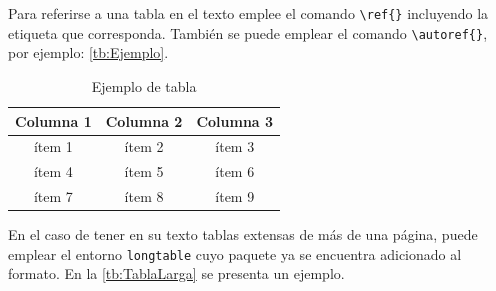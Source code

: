 Para referirse a una tabla en el texto emplee el comando \lstinline|\ref{}| incluyendo la etiqueta que corresponda. También se puede emplear el comando \lstinline|\autoref{}|, por ejemplo: \autoref{tb:Ejemplo}.

\begin{table}[]
	\centering
	\captionsetup{width=0.4\textwidth}
	\caption{Ejemplo de tabla}
	\label{tb:Ejemplo}
	\begin{tabular}{@{}ccc@{}}
		\toprule
		\textbf{Columna 1} & \textbf{Columna 2} & \textbf{Columna 3} \\ \midrule
		ítem 1 & ítem 2 & ítem 3 \\
		ítem 4 & ítem 5 & ítem 6 \\
		ítem 7 & ítem 8 & ítem 9 \\ \bottomrule
	\end{tabular}
	\NotaCaptionUTPL{}
\end{table}

En el caso de tener en su texto tablas extensas de más de una página, puede emplear el entorno \lstinline|longtable| cuyo paquete ya se encuentra adicionado al formato. En la \autoref{tb:TablaLarga} se presenta un ejemplo. 

